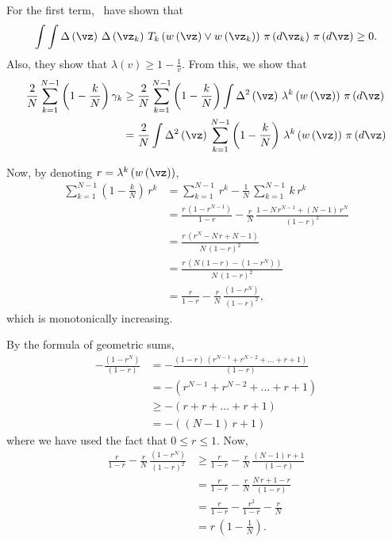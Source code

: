 \begin{proofEnd}
For the first term,~\citet[Theorem 3]{tan_monte_2006} have shown that
\begin{align}
  \int \int
  \Delta\left(\vz\right) \,
  \Delta\left(\vz_k\right) \,
  T_k\left(w\left(\vz\right) \vee w\left(\vz_k\right) \right) \, \pi\left(d\vz_k\right) \, \pi\left(d\vz\right)
  \geq
  0.
\end{align}
Also, they show that \(\lambda\left(v\right) \geq 1 - \frac{1}{v}\).
From this, we show that
\begin{align}
  \frac{2}{N} \sum_{k=1}^{N-1} \left(1 - \frac{k}{N}\right) \gamma_k
  &\geq
  \frac{2}{N} \sum_{k=1}^{N-1} \left(1 - \frac{k}{N}\right)
  \int
  \Delta^2\left(\vz\right) \, \lambda^k\left(w\left(\vz\right)\right) \, \pi\left(d\vz\right)
  \\
  &=
  \frac{2}{N}
  \int
  \Delta^2\left(\vz\right) \,
   \sum_{k=1}^{N-1} 
  \left(1 - \frac{k}{N}\right) \, \lambda^k\left(w\left(\vz\right)\right)
  \, \pi\left(d\vz\right)\label{eq:autocov_bound}
\end{align}

Now, by denoting \(r = \lambda^k\left(w\left(\vz\right)\right)\),
\begin{align}
 \sum_{k=1}^{N-1} \left(1 - \frac{k}{N}\right) \, r^k
 &=
 \sum_{k=1}^{N-1} \, r^k
 -
 \frac{1}{N}\,\sum_{k=1}^{N-1} \,k\, r^k
 \\
 &=
 \frac{r \, \left( 1 - r^{N-1} \right) }{1 - r} 
 -
 \frac{r}{N}
 \,
 \frac{1 - N\,r^{N-1} + \left(N-1\right)\,r^{N} }{{\left(1 - r\right)}^2} 
 \\
 &=
 \frac{
   r\,\left(r^N - N\,r + N - 1\right)
 }{
   N\,{\left(1-r\right)}^2
 }
 \\
 &=
 \frac{
   r\,\left( N \left(1-r\right) - \left(1-r^N\right) \right)
 }{
   N\,{\left(1-r\right)}^2
 }
 \\
 &=
 \frac{r}{1-r} -
 \frac{r}{N}\,\frac{\left(1-r^N\right)}{{\left(1-r\right)}^2},
\end{align}
which is monotonically increasing.

By the formula of geometric sums,
\begin{align}
  -\frac{\left(1-r^N\right)}{{\left(1-r\right)}}
  &=
  -\frac{\left(1-r\right)\,\left(r^{N-1} + r^{N-2} + \ldots + r + 1\right)}{{\left(1-r\right)}}
  \\
  &=
  -\left(r^{N-1} + r^{N-2} + \ldots + r + 1\right)
  \\
  &\geq
  -\left(r + r + \ldots + r + 1\right)
  \\
  &=
  -\left((N-1)\,r + 1\right)
\end{align}
where we have used the fact that \(0 \leq r \leq 1\).
Now, 
\begin{align}
 \frac{r}{1-r} -
 \frac{r}{N}\,\frac{\left(1-r^N\right)}{{\left(1-r\right)}^2}
 &\geq 
 \frac{r}{1-r} -
 \frac{r}{N}\,\frac{(N-1)\,r + 1}{\left(1-r\right)}
 \\
 &=
 \frac{r}{1-r} -
 \frac{r}{N}\,\frac{N\,r + 1 - r}{\left(1-r\right)}
 \\
 &=
 \frac{r}{1-r}
 -
 \frac{r^2}{1-r}
 -
 \frac{r}{N}
 \\
 &=
 r\,\left(1 - \frac{1}{N}\right).
\end{align}


\end{proofEnd}
